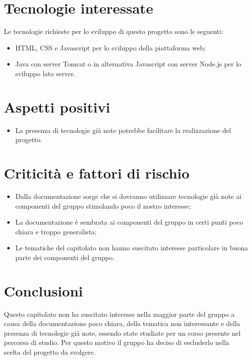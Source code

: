 \section{Tecnologie interessate}
Le tecnologie richieste per lo sviluppo di questo progetto sono le seguenti:
\begin{itemize}
	\item HTML, CSS e Javascript per lo sviluppo della piattaforma web;
	\item Java con server Tomcat o in alternativa Javascript con server Node.js per lo sviluppo lato server.
\end{itemize}
\section{Aspetti positivi}
\begin{itemize}
	\item La presenza di tecnologie già note potrebbe facilitare la realizzazione del progetto.
\end{itemize}
\section{Criticità e fattori di rischio}
\begin{itemize}
	\item Dalla documentazione sorge che si dovranno utilizzare tecnologie già note ai componenti del gruppo stimolando poco il nostro interesse;
	\item La documentazione è sembrata ai componenti del gruppo in certi punti poco chiara e troppo generalista;
	\item Le tematiche del capitolato non hanno suscitato interesse particolare in buona parte dei componenti del gruppo.
\end{itemize}
\section{Conclusioni}
Questo capitolato non ha suscitato interesse nella maggior parte del gruppo a causa della documentazione poco chiara, della tematica non interessante e della presenza di tecnologie già note, essendo state studiate per un corso presente nel percorso di studio. Per questo motivo il gruppo ha deciso di escluderlo nella scelta del progetto da svolgere.